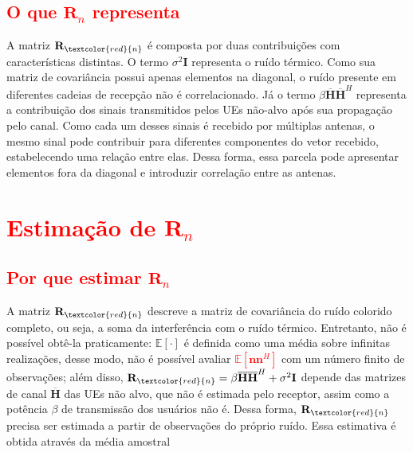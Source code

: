 \subsection{\texorpdfstring{\textcolor{red}{O que $\mathbf{R}_n$ representa}}{O que Rn representa}}\label{subsec:o-que-R-representa}


A matriz $\mathbf{R}_{\textcolor{red}{n}}$ é composta por duas contribuições com características distintas. O termo $\sigma^2\mathbf{I}$ representa o ruído térmico. Como sua matriz de covariância possui apenas elementos na diagonal, o ruído presente em diferentes cadeias de recepção não é correlacionado. Já o termo $\beta\overline{\mathbf{H}}\overline{\mathbf{H}}^H$ representa a contribuição dos sinais transmitidos pelos UEs não-alvo após sua propagação pelo canal. Como cada um desses sinais é recebido por múltiplas antenas, o mesmo sinal pode contribuir para diferentes componentes do vetor recebido, estabelecendo uma relação entre elas. Dessa forma, essa parcela pode apresentar elementos fora da diagonal e introduzir correlação entre as antenas.

\section{\texorpdfstring{\textcolor{red}{Estimação de $\mathbf{R}_n$}}{Estimação de Rn}}
\label{sec:estimacao-R}

\subsection{\texorpdfstring{\textcolor{red}{Por que estimar $\mathbf{R}_n$}}{Por que estimar Rn}}

A matriz $\mathbf{R}_{\textcolor{red}{n}}$ descreve a matriz de covariância do ruído colorido completo, ou seja, a soma da interferência com o ruído térmico. Entretanto, não é possível obtê-la praticamente:  $\mathbb{E}[\cdot]$ é definida como uma média sobre infinitas realizações, desse modo, não é possível avaliar \textcolor{red}{$\mathbb{E}[\mathbf{n}\mathbf{n}^H]$} com um número finito de observações; além disso, $
\mathbf{R}_{\textcolor{red}{n}}=\beta\overline{\mathbf{H}}\overline{\mathbf{H}}^H+\sigma^2\mathbf{I}
$ depende das matrizes de canal $\overline{\mathbf{H}}$ das UEs não alvo, que não é estimada pelo receptor, assim como a potência $\beta$ de transmissão dos usuários não é. Dessa forma, $\mathbf{R}_{\textcolor{red}{n}}$ precisa ser estimada a partir de observações do próprio ruído. Essa estimativa é obtida através da média amostral

